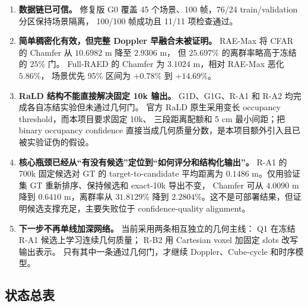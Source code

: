 \documentclass[11pt,a4paper,fontset=none]{ctexart}
\begin{document}
\begin{enumerate}
  \item \textbf{数据链已可信。}
  修复版 G0 覆盖 45 个场景、100 帧，76/24 train/validation 分区保持场景隔离，
  100/100 帧成功且 11/11 项检查通过。

  \item \textbf{简单稠密化有效，但完整 Doppler 早融合未被证明。}
  RAE-Max 将 CFAR 的 Chamfer 从 $10.6982$ m 降至 $2.9306$ m，
  但 $25.697\%$ 的离群率略高于冻结的 $25\%$ 门。
  Full-RAED 的 Chamfer 为 $3.1024$ m，相对 RAE-Max 恶化 $5.86\%$，
  场景优先 95\% 区间为 $+0.78\%$ 到 $+14.69\%$。

  \item \textbf{RaLD 结构不能直接解决固定 10k 输出。}
  G1D、G1G、R-A1 和 R-A2 均完成各自冻结实验但未通过几何门。
  官方 RaLD 原生采用变长 occupancy threshold，而本项目要求固定 10k、
  三段距离配额和 5 cm 最小间距；把 binary occupancy confidence
  直接当成几何质量分数，是本项目额外引入且已被实验证伪的假设。

  \item \textbf{核心瓶颈已经从“有没有候选”定位到“如何评分和结构化输出”。}
  R-A1 的 700k 固定候选对 GT 的 target-to-candidate 平均距离为
  $0.1486$ m。仅用验证集 GT 重新排序、保持候选和 exact-10k 导出不变，
  Chamfer 可从 $4.0090$ m 降到 $0.6410$ m，离群率从 $31.8129\%$
  降到 $2.2804\%$。这不是可部署结果，但证明候选支撑充足，主要失败位于
  confidence-quality alignment。

  \item \textbf{下一步不再单线加深网络。}
  当前采用两条相互独立的几何主线：
  Q1 在冻结 R-A1 候选上学习连续几何质量；
  R-B2 用 Cartesian voxel 加固定 slots 改写输出表示。
  只有其中一条通过几何门，才继续 Doppler、Cube-cycle 和时序模型。
\end{enumerate}

\subsection{状态总表}
\end{document}
